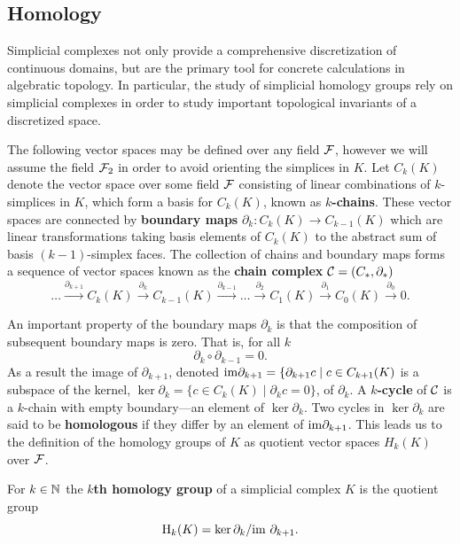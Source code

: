 
\subsection{Homology} %
\label{sec:homology}

Simplicial complexes not only provide a comprehensive discretization of continuous domains, but are the primary tool for concrete calculations in algebratic topology.
In particular, the study of simplicial homology groups rely on simplicial complexes in order to study important topological invariants of a discretized space.

The following vector spaces may be defined over any field $\mathcal{F}$, however we will assume the field $\mathcal{F}_2$ in order to avoid orienting the simplices in $K$.
Let $C_k(K)$ denote the vector space over some field $\mathcal{F}$ consisting of linear combinations of $k$-simplices in $K$, which form a basis for $C_k(K)$, known as \textbf{$k$-chains}.
These vector spaces are connected by \textbf{boundary maps} $\partial_k:C_k(K)\to C_{k-1}(K)$ which are linear transformations taking basis elements of $C_k(K)$ to the abstract sum of basis $(k-1)$-simplex faces.
The collection of chains and boundary maps forms a sequence of vector spaces known as the \textbf{chain complex} $\mathcal{C} = (C_*,\partial_*)$
\[
    \ldots\xrightarrow{\partial_{k+1}}
    C_k(K)\xrightarrow{\partial_{k}}
    C_{k-1}(K)\xrightarrow{\partial_{k-1}}
    \ldots\xrightarrow{\partial_2}
    C_1(K)\xrightarrow{\partial_{1}}
    C_0(K)\xrightarrow{\partial_0} 0.
\]

An important property of the boundary maps $\partial_k$ is that the composition of subsequent boundary maps is zero.
That is, for all $k$
\[
  \partial_k\circ\partial_{k-1} = 0.
\]
As a result the image of $\partial_{k+1}$, denoted $\mathrm{im}\partial_{k+1} = \{\partial_{k+1}c\mid c\in C_{k+1}(K)$ is a subspace of the kernel, $\ker\partial_k = \{c\in C_k(K)\mid \partial_k c = 0\}$, of $\partial_k$.
A \textbf{$k$-cycle} of $\mathcal{C}$ is a $k$-chain with empty boundary---an element of $\ker\partial_k$.
Two cycles in $\ker\partial_k$ are said to be \textbf{homologous} if they differ by an element of $\mathrm{im}\partial_{k+1}$.
This leads us to the definition of the homology groups of $K$ as quotient vector spaces $H_k(K)$ over $\mathcal{F}$.

\begin{definition}
    For $k\in\mathbb{N}$ the \textbf{$k$th homology group} of a simplicial complex $K$ is the quotient group
    \[ \mathrm{H}_k(K) = \ker\partial_k/\mathrm{im}~\partial_{k+1}. \]
\end{definition}

